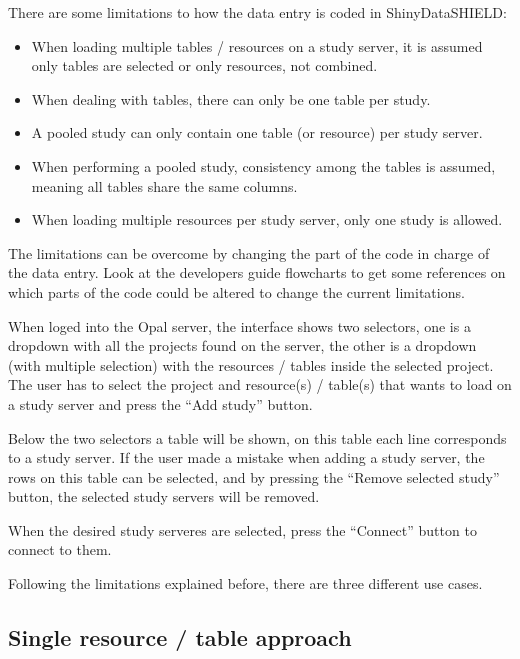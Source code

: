 \documentclass[
]{book}
\providecommand{\tightlist}{%
  \setlength{\itemsep}{0pt}\setlength{\parskip}{0pt}}
\begin{document}
There are some limitations to how the data entry is coded in ShinyDataSHIELD:

\begin{itemize}
\tightlist
\item
  When loading multiple tables / resources on a study server, it is assumed only tables are selected or only resources, not combined.
\item
  When dealing with tables, there can only be one table per study.
\item
  A pooled study can only contain one table (or resource) per study server.
\item
  When performing a pooled study, consistency among the tables is assumed, meaning all tables share the same columns.
\item
  When loading multiple resources per study server, only one study is allowed.
\end{itemize}

The limitations can be overcome by changing the part of the code in charge of the data entry. Look at the developers guide flowcharts to get some references on which parts of the code could be altered to change the current limitations.

When loged into the Opal server, the interface shows two selectors, one is a dropdown with all the projects found on the server, the other is a dropdown (with multiple selection) with the resources / tables inside the selected project. The user has to select the project and resource(s) / table(s) that wants to load on a study server and press the ``Add study'' button.

Below the two selectors a table will be shown, on this table each line corresponds to a study server. If the user made a mistake when adding a study server, the rows on this table can be selected, and by pressing the ``Remove selected study'' button, the selected study servers will be removed.

When the desired study serveres are selected, press the ``Connect'' button to connect to them.

Following the limitations explained before, there are three different use cases.

\hypertarget{single-resource-table-approach}{%
\subsection{Single resource / table approach}\label{single-resource-table-approach}}
\end{document}
